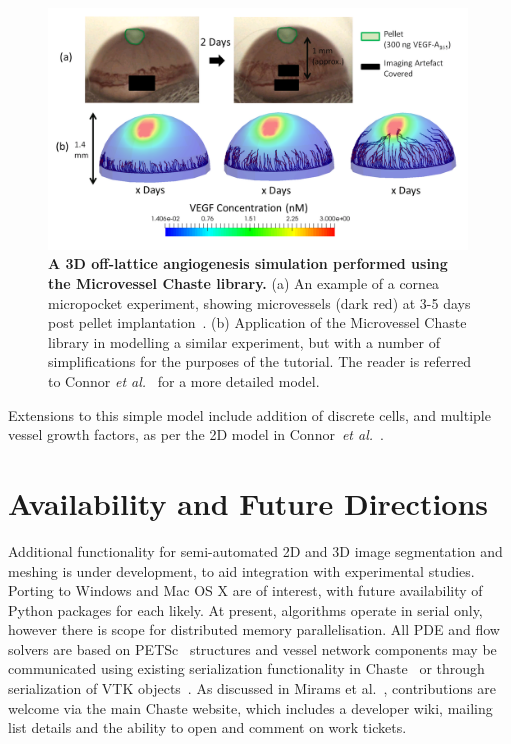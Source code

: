 \documentclass[10pt,letterpaper]{article}
\begin{document}
\begin{figure}[!h]
\centering
\includegraphics[width=0.99\textwidth]{Fig4.png}
\caption{{\bf A 3D off-lattice angiogenesis simulation performed using the Microvessel Chaste library.}
(a) An example of a cornea micropocket experiment, showing microvessels (dark red) at 3-5 days post pellet implantation~\cite{Connor2015}. (b) Application of the Microvessel Chaste library in modelling a similar experiment, but with a number of simplifications for the purposes of the tutorial. The reader is referred to Connor \emph{et al.}~\cite{Connor2015} for a more detailed model.}
\label{fig4}
\end{figure}

Extensions to this simple model include addition of discrete cells, and multiple vessel growth factors, as per the 2D model in Connor~\emph{et al.}~\cite{Connor2015}.

\section*{Availability and Future Directions}

Additional functionality for semi-automated 2D and 3D image segmentation and meshing is under development, to aid integration with experimental studies. Porting to Windows and Mac OS X are of interest, with future availability of Python packages for each likely. At present, algorithms operate in serial only, however there is scope for distributed memory parallelisation. All PDE and flow solvers are based on PETSc~\cite{Balay2014} structures and vessel network components may be communicated using existing serialization functionality in Chaste~\cite{Harvey2015} or through serialization of VTK objects~\cite{Schroeder2003}. As discussed in Mirams et al.~\cite{Mirams2013}, contributions are welcome via the main Chaste website, which includes a developer wiki, mailing list details and the ability to open and comment on work tickets. 
\end{document}
